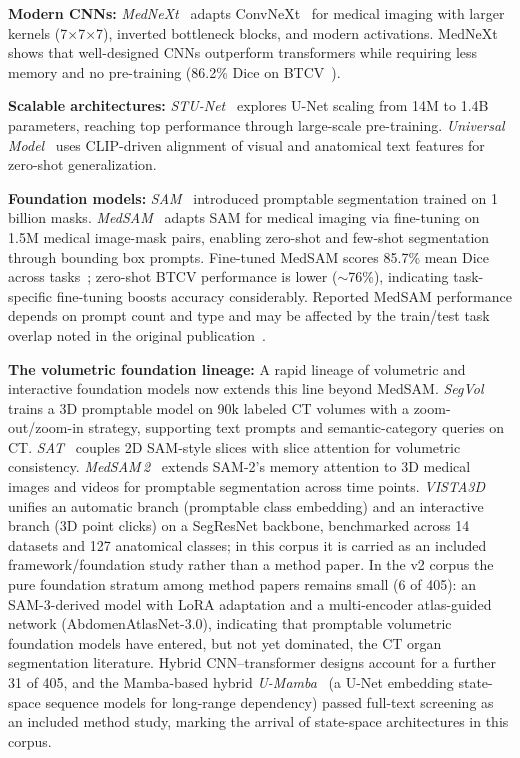 \textbf{Modern CNNs:} \emph{MedNeXt}~\cite{roy2023mednext} adapts ConvNeXt~\cite{liu2022convnext} for medical imaging with larger kernels (7$\times$7$\times$7), inverted bottleneck blocks, and modern activations. MedNeXt shows that well-designed CNNs outperform transformers while requiring less memory and no pre-training (86.2\% Dice on BTCV~\cite{roy2023mednext}).

\textbf{Scalable architectures:} \emph{STU-Net}~\cite{huang2023stunet} explores U-Net scaling from 14M to 1.4B parameters, reaching top performance through large-scale pre-training. \emph{Universal Model}~\cite{liu2023universal} uses CLIP-driven alignment of visual and anatomical text features for zero-shot generalization.

\textbf{Foundation models:} \emph{SAM}~\cite{kirillov2023sam} introduced promptable segmentation trained on 1 billion masks. \emph{MedSAM}~\cite{ma2024medsam} adapts SAM for medical imaging via fine-tuning on 1.5M medical image-mask pairs, enabling zero-shot and few-shot segmentation through bounding box prompts. Fine-tuned MedSAM scores 85.7\% mean Dice across tasks~\cite{ma2024medsam}; zero-shot BTCV performance is lower ($\sim$76\%), indicating task-specific fine-tuning boosts accuracy considerably. Reported MedSAM performance depends on prompt count and type and may be affected by the train/test task overlap noted in the original publication~\cite{ma2024medsam}.

\textbf{The volumetric foundation lineage:} A rapid lineage of volumetric and interactive foundation models now extends this line beyond MedSAM. \emph{SegVol}~\cite{du2023segvol} trains a 3D promptable model on 90k labeled CT volumes with a zoom-out/zoom-in strategy, supporting text prompts and semantic-category queries on CT. \emph{SAT}~\cite{zhang2022satr} couples 2D SAM-style slices with slice attention for volumetric consistency. \emph{MedSAM\,2}~\cite{ma2025medsam2} extends SAM-2's memory attention to 3D medical images and videos for promptable segmentation across time points. \emph{VISTA3D}~\cite{he2024vista3d} unifies an automatic branch (promptable class embedding) and an interactive branch (3D point clicks) on a SegResNet backbone, benchmarked across 14 datasets and 127 anatomical classes; in this corpus it is carried as an included framework/foundation study rather than a method paper. In the v2 corpus the pure foundation stratum among method papers remains small (6 of 405): an SAM-3-derived model with LoRA adaptation and a multi-encoder atlas-guided network (AbdomenAtlasNet-3.0), indicating that promptable volumetric foundation models have entered, but not yet dominated, the CT organ segmentation literature. Hybrid CNN--transformer designs account for a further 31 of 405, and the Mamba-based hybrid \emph{U-Mamba}~\cite{jun2024umamba} (a U-Net embedding state-space sequence models for long-range dependency) passed full-text screening as an included method study, marking the arrival of state-space architectures in this corpus.

